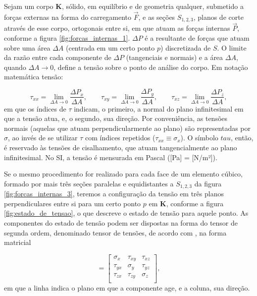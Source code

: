 

Sejam um corpo $\bm{K}$, sólido, em equilíbrio e de geometria qualquer, submetido a forças externas na forma do carregamento $\vec{F}$, e as seções $S_{1,2,3}$, planos de corte através de esse corpo, ortogonais entre si, em que atuam as forças internas $\vec{P}$, conforme a figura \ref{fig:forcas_internas_1}. $\Delta P$ é a resultante de forças que atuam sobre uma área $\Delta A$ (centrada em um certo ponto $p$) discretizada de $S$. O limite da razão entre cada componente de $\Delta P$ (tangenciais e normais) e a área $\Delta A$, quando $\Delta A \to 0$, define a tensão sobre o ponto de análise do corpo. Em notação matemática tensão:

\begin{equation}
    \tau_{xx} = \lim_{\Delta A \to 0} \frac{\Delta P_x}{\Delta A}, \qquad
    \tau_{xy} = \lim_{\Delta A \to 0} \frac{\Delta P_y}{\Delta A}, \qquad
    \tau_{xz} = \lim_{\Delta A \to 0} \frac{\Delta P_z}{\Delta A},
\end{equation}
em que os índices de $\tau$ indicam, o primeiro, a normal do plano infinitesimal em que a tensão atua, e, o segundo, sua direção. Por conveniência, as tensões normais (aquelas que atuam perpendicularmente ao plano) são representadas por $\sigma$, ao invés de se utilizar $\tau$ com índices repetidos ($\tau_{xx} \equiv \sigma_x$). O símbolo $tau$, então, é reservado às tensões de cisalhamento, que atuam tangencialmente ao plano infinitesimal. No SI, a tensão é mensurada em Pascal ([Pa] = [N/m²]).

Se o mesmo procedimento for realizado para cada face de um elemento cúbico, formado por mais três seções paralelas e equidistantes a $S_{1,2,3}$ da figura \ref{fig:forcas_internas_3}, teremos a configuração da tensão em três planos perpendiculares entre si para um certo ponto $p$ em $\bm{K}$,  conforme a figura \ref{fig:estado_de_tensao}, o que descreve o estado de tensão para aquele ponto. As componentes do estado de tensão podem ser dispostas na forma do tensor de segunda ordem, denominado tensor de tensões, de acordo com , na forma matricial

\begin{equation}
    [\sigma] =
    \begin{bmatrix}
        \sigma_x & \tau_{xy} & \tau_{xz} \\
        \tau_{yx} & \sigma_{y} & \tau_{yz} \\
        \tau_{zx} & \tau_{zy} & \sigma_{z} \\
    \end{bmatrix},
\end{equation}
em que a linha indica o plano em que a componente age, e a coluna, sua direção.

